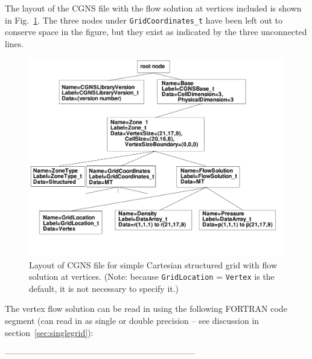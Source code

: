 \documentclass[12pt]{article}
\begin{document}
The layout of the CGNS file with the flow 
solution at vertices included 
is shown in Fig.~\ref{FIGtree_cartesian_solV}.
The three nodes under {\tt GridCoordinates\_t} have been left out
to conserve space in the figure,
but they exist as indicated by the three unconnected lines.

\begin{figure}[hpbt]
\centerline{{\includegraphics[width=150mm]{figures/tree_cartesian_solV}}}
\caption{Layout of CGNS file for simple Cartesian
structured grid with flow solution at vertices.  (Note: because
{\tt GridLocation} = {\tt Vertex} is the default, it is not
necessary to specify it.)}
\label{FIGtree_cartesian_solV}
\end{figure}
%

The vertex flow solution can be read in using the following 
FORTRAN code segment (can read in as single or double precision -- see
discussion in section~\ref{sec:singlegrid}):

--------------------------------------------------------------------
\end{document}
